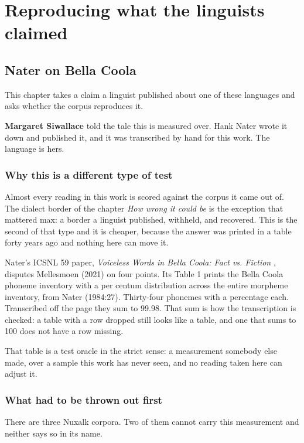 \chapter{Reproducing what the linguists claimed}

\section{Nater on Bella Coola}

This chapter takes a claim a linguist published about one of these languages and asks whether
the corpus reproduces it.

\textbf{Margaret Siwallace} told the tale this is measured over. Hank Nater wrote it down and
published it, and it was transcribed by hand for this work. The language is hers.

\subsection{Why this is a different type of test}

Almost every reading in this work is scored against the corpus it came out of. The dialect border
of the chapter \emph{How wrong it could be} is the exception that mattered max: a border a linguist
published, withheld, and recovered. This is the second of that type and it is cheaper, because the
answer was printed in a table forty years ago and nothing here can move it.

Nater's ICSNL 59 paper, \emph{Voiceless Words in Bella Coola: Fact vs. Fiction} \cite{src:Nater-2024}, disputes Mellesmoen
(2021) on four points. Its Table 1 prints the Bella Coola phoneme inventory with a per centum
distribution across the entire morpheme inventory, from Nater (1984:27). Thirty-four phonemes with
a percentage each. Transcribed off the page they sum to 99.98. That sum is how the transcription is
checked: a table with a row dropped still looks like a table, and one that sums to 100 does not have
a row missing.

That table is a test oracle in the strict sense: a measurement somebody else made,
over a sample this work has never seen, and no reading taken here can adjust it.

\subsection{What had to be thrown out first}

There are three Nuxalk corpora. Two of them cannot
carry this measurement and neither says so in its name.

